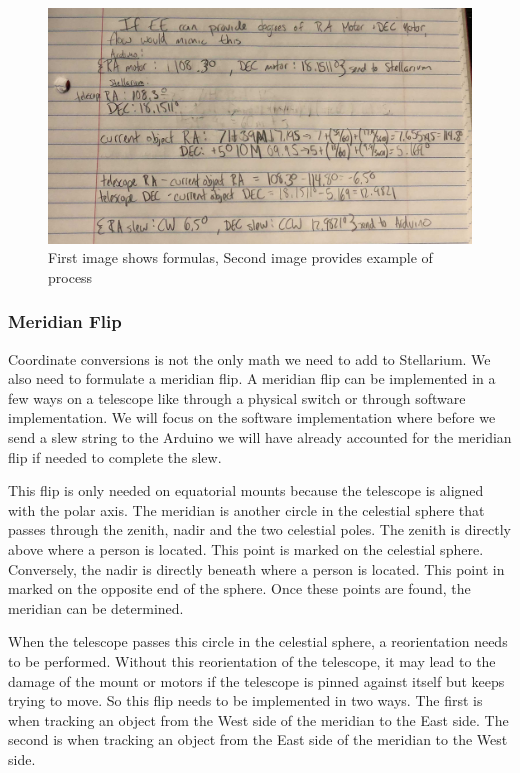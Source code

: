 \documentclass[12pt]{report}
\begin{document}
\begin{figure}[h]
  \centering
  \includegraphics[width=\linewidth]{convExample}
  \caption{First image shows formulas, Second image provides example of process}
\end{figure}

\subsubsection*{Meridian Flip}

Coordinate conversions is not the only math we need to add to Stellarium. We also need to formulate a meridian flip. A meridian flip can be implemented in a few ways on a telescope like through a physical switch or through software implementation. We will focus on the software implementation where before we send a slew string to the Arduino we will have already accounted for the meridian flip if needed to complete the slew.

This flip is only needed on equatorial mounts because the telescope is aligned with the polar axis. The meridian is another circle in the celestial sphere that passes through the zenith, nadir and the two celestial poles. The zenith is directly above where a person is located. This point is marked on the celestial sphere. Conversely, the nadir is directly beneath where a person is located. This point in marked on the opposite end of the sphere. Once these points are found, the meridian can be determined.

When the telescope passes this circle in the celestial sphere, a reorientation needs to be performed. Without this reorientation of the telescope, it may lead to the damage of the mount or motors if the telescope is pinned against itself but keeps trying to move. So this flip needs to be implemented in two ways. The first is when tracking an object from the West side of the meridian to the East side. The second is when tracking an object from the East side of the meridian to the West side.
\end{document}
